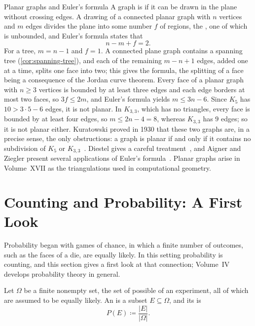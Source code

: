 \begin{note}{Planar graphs and Euler's formula}
A graph is  if it can be drawn in the plane without crossing edges. A drawing of a connected planar graph with $n$ vertices and $m$ edges divides the plane into some number $f$ of regions, the , one of which is unbounded, and Euler's formula states that
\[
n-m+f=2 .
\]
For a tree, $m=n-1$ and $f=1$. A connected plane graph contains a spanning tree (\cref{cor:spanning-tree}), and each of the remaining $m-n+1$ edges, added one at a time, splits one face into two; this gives the formula, the splitting of a face being a consequence of the Jordan curve theorem. Every face of a planar graph with $n\ge3$ vertices is bounded by at least three edges and each edge borders at most two faces, so $3f\le2m$, and Euler's formula yields $m\le3n-6$. Since $K_5$ has $10>3\cdot5-6$ edges, it is not planar. In $K_{3,3}$, which has no triangles, every face is bounded by at least four edges, so $m\le2n-4=8$, whereas $K_{3,3}$ has $9$ edges; so it is not planar either. Kuratowski proved in 1930 that these two graphs are, in a precise sense, the only obstructions: a graph is planar if and only if it contains no subdivision of $K_5$ or $K_{3,3}$~\cite{kuratowski1930}. Diestel gives a careful treatment~\cite[Chap.~4]{diestel2017}, and Aigner and Ziegler present several applications of Euler's formula~\cite{aigner2018proofs}. Planar graphs arise in Volume~XVII as the triangulations used in computational geometry.
\end{note}

\section{Counting and Probability: A First Look}
\label{sec:counting-probability}

Probability began with games of chance, in which a finite number of outcomes, such as the faces of a die, are equally likely. In this setting probability is counting, and this section gives a first look at that connection; Volume~IV develops probability theory in general.

\begin{definition}
\label{def:classical-probability}
Let $\Omega$ be a finite nonempty set, the set of possible  of an experiment, all of which are assumed to be equally likely. An  is a subset $E\subseteq\Omega$, and its  is
\[
P(E)\coloneqq\frac{|E|}{|\Omega|}.
\]
\end{definition}

